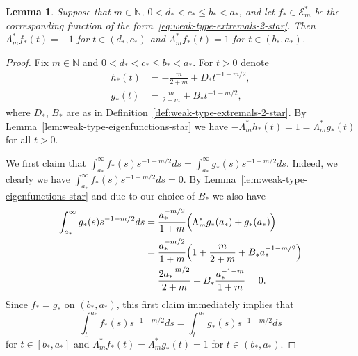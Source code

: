 \documentclass[a4paper]{amsart} %
\newtheorem{lemma}[theorem]{Lemma}
\theoremstyle{definition}
\theoremstyle{remark}
\numberwithin{equation}{section}
\newcommand*{\NN}{\mathbb{N}}
\newcommand*{\NNone}{\mathbb{N}}
\newcommand*{\fclassStar}[1]{\mathcal{E}_{#1}^*}
\newcommand*{\fStar}{f_{*}}
\newcommand*{\fZeroStar}{g_{*}}
\newcommand*{\fOneStar}{h_{*}}
\newcommand*{\aStar}{a_*}
\newcommand*{\bStar}{b_*}
\newcommand*{\cStar}{c_*}
\newcommand*{\dStar}{d_*}
\newcommand*{\dOneStar}{D_*}%
\newcommand*{\dZeroStar}{B_*}%
\begin{document}
\begin{lemma}
	\label{lem:weak-type-extremals-2-star}
	Suppose that $m\in\NNone$, $0< \dStar{} < \cStar{} \leq \bStar{} < \aStar{}$,
	and let $\fStar\in\fclassStar{m}$ be the corresponding function of the form~\eqref{eq:weak-type-extremals-2-star}.
	Then $\Lambda_m^* \fStar(t)= - 1$ for $t\in(\dStar,\cStar)$ and $\Lambda_m^* \fStar(t)=1$ for $t\in(\bStar,\aStar)$.
\end{lemma}

\begin{proof}
	Fix $m\in\NN$ and $0< \dStar < \cStar \leq \bStar  < \aStar$.
	For $t>0$ denote
	\begin{align*}
	\fOneStar(t) &=  -\frac{m}{2+m} +\dOneStar{} t^{-1-m/2},\\
	\fZeroStar(t) &= \frac{m}{2+m} + \dZeroStar t^{-1-m/2},
	\end{align*}
	where $\dOneStar$, $\dZeroStar$ are as in Definition~\ref{def:weak-type-extremals-2-star}. 
	By Lemma~\ref{lem:weak-type-eigenfunctions-star} 
	we have $-\Lambda_m^* \fOneStar(t) = 1 = \Lambda_m^* \fZeroStar(t)$ for all $t>0$.
	
	
	
	
	We first claim that $\int_{\aStar}^\infty \fStar(s) s^{-1-m/2} ds 
	=\int_{\aStar}^\infty \fZeroStar(s) s^{-1-m/2} ds$.
	Indeed, we clearly we have $\int_{\aStar}^\infty \fStar(s) s^{-1-m/2} ds
	= 0$.
	By Lemma~\ref{lem:weak-type-eigenfunctions-star} and due to our choice of $\dZeroStar$ we also have
	\begin{align*}
	\int_{\aStar}^\infty \fZeroStar(s) s^{-1-m/2} ds
	&= \frac{\aStar^{-m/2}}{1+m} \Bigl(\Lambda_m^* \fZeroStar(\aStar) + \fZeroStar(\aStar) \Bigr)\\
	&= \frac{\aStar^{-m/2}}{1+m} \Bigl( 1 + \frac{m}{2+m} + \dZeroStar \aStar^{-1-m/2} \Bigr)\\
	&= \frac{2\aStar^{-m/2} }{2+m}+ \dZeroStar \frac{\aStar^{-1-m}}{1+m}  = 0.
	\end{align*}
	Since $\fStar=\fZeroStar$ on $(\bStar,\aStar)$, 
	this first claim immediately implies that
	\[
	\int_t^{\aStar} \fStar(s) s^{-1-m/2} ds =\int_t^{\aStar} \fZeroStar(s) s^{-1-m/2} ds
	\]
	 for $t\in [\bStar,\aStar]$
	and $\Lambda_m^* \fStar (t) = \Lambda_m^* \fZeroStar (t) = 1$ for $t\in(\bStar,\aStar)$.
	


\end{proof}
\end{document}
